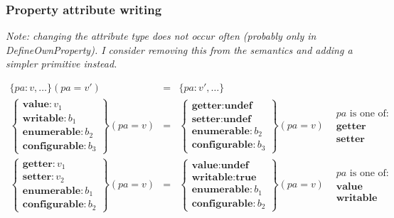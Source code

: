 \documentclass[draft, 10pt]{article}
\newcommand{\bool}[0]{b}
\newcommand{\undef}[0]{\textbf{undef}}
\newcommand{\true}[0]{\textbf{true}}
\newcommand{\pattr}[0]{\textit{pa}}
\newcommand{\pavalue}[0]{\textbf{value}}
\newcommand{\pawritable}[0]{\textbf{writable}}
\newcommand{\paget}[0]{\textbf{getter}}
\newcommand{\paset}[0]{\textbf{setter}}
\newcommand{\paenum}[0]{\textbf{enumerable}}
\newcommand{\paconfig}[0]{\textbf{configurable}}
\newcommand{\bigval}[0]{v}
\newcommand{\papropset}[3]{#1(#2 = #3)}
\begin{document}
\subsubsection{Property attribute writing}

\textit{Note: changing the attribute type does not occur often (probably only in DefineOwnProperty). I consider removing this from the semantics and adding a simpler primitive instead.}

\[
\begin{array}{rclc}
\papropset{\{\pattr : \bigval, \dots\}}{\pattr}{\bigval'} &=& \{\pattr : \bigval', \dots\} \\
\papropset{\left\{\begin{array}{l}\pavalue : \bigval_1 \\ \pawritable : \bool_1 \\ \paenum : \bool_2 \\ \paconfig : \bool_3\end{array}\right\}}{\pattr}{\bigval} &=& \papropset{\left\{\begin{array}{l}\paget : \undef \\ \paset : \undef \\ \paenum : \bool_2 \\ \paconfig : \bool_3 \end{array}\right\}}{\pattr}{\bigval} & \begin{array}{l}\pattr \textrm{ is one of:}\\ \paget \\ \paset\end{array} \\
\papropset{\left\{\begin{array}{l}\paget : \bigval_1 \\ \paset : \bigval_2 \\ \paenum : \bool_1 \\ \paconfig : \bool_2 \end{array}\right\}}{\pattr}{\bigval} &=& \papropset{\left\{\begin{array}{l}\pavalue : \undef \\ \pawritable : \true \\ \paenum : \bool_1 \\ \paconfig : \bool_2 \end{array}\right\}}{\pattr}{\bigval} & \begin{array}{l}\pattr \textrm{ is one of:}\\ \pavalue \\ \pawritable\end{array}
\end{array}
\]
\end{document}
